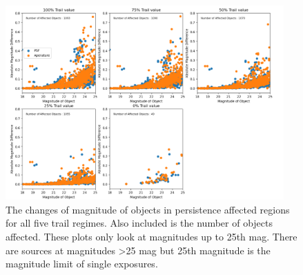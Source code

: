\documentclass[DM,authoryear,toc]{lsstdoc}
\begin{document}
\begin{figure}[!htp]
  \centering
  \includegraphics[width=0.95\textwidth, angle=0]{Total_Objects_affected.png}
  \caption{
  The changes of magnitude of objects in persistence affected regions for all five trail regimes. 
  Also included is the number of objects affected.
  These plots only look at magnitudes up to 25th mag.
  There are sources at magnitudes >25 mag but 25th magnitude is the magnitude limit of single exposures.
  }\label{fig:affected_objects_all}
\end{figure}





\end{document}
